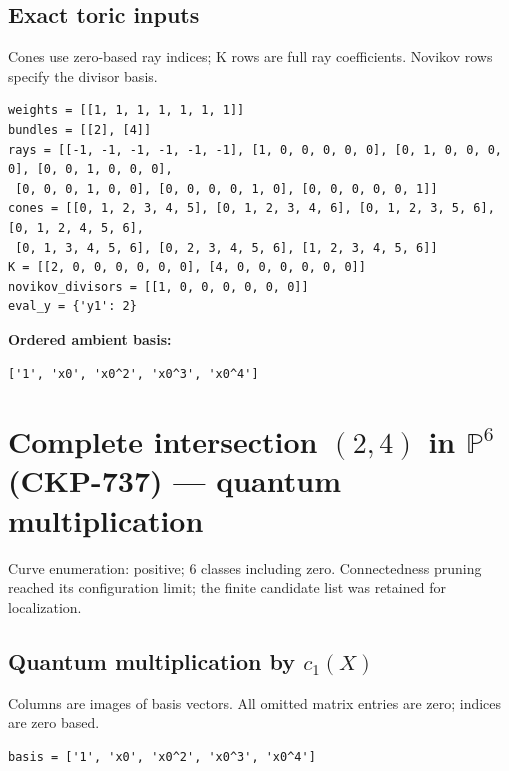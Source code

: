 \documentclass[10pt,a4paper]{article}
\begin{document}
\subsection*{Exact toric inputs}
Cones use zero-based ray indices; K rows are full ray coefficients. Novikov rows specify the divisor basis.

\begin{lstlisting}
weights = [[1, 1, 1, 1, 1, 1, 1]]
bundles = [[2], [4]]
rays = [[-1, -1, -1, -1, -1, -1], [1, 0, 0, 0, 0, 0], [0, 1, 0, 0, 0, 0], [0, 0, 1, 0, 0, 0],
 [0, 0, 0, 1, 0, 0], [0, 0, 0, 0, 1, 0], [0, 0, 0, 0, 0, 1]]
cones = [[0, 1, 2, 3, 4, 5], [0, 1, 2, 3, 4, 6], [0, 1, 2, 3, 5, 6], [0, 1, 2, 4, 5, 6],
 [0, 1, 3, 4, 5, 6], [0, 2, 3, 4, 5, 6], [1, 2, 3, 4, 5, 6]]
K = [[2, 0, 0, 0, 0, 0, 0], [4, 0, 0, 0, 0, 0, 0]]
novikov_divisors = [[1, 0, 0, 0, 0, 0, 0]]
eval_y = {'y1': 2}
\end{lstlisting}

\textbf{Ordered ambient basis:}
\begin{lstlisting}
['1', 'x0', 'x0^2', 'x0^3', 'x0^4']
\end{lstlisting}

\clearpage\section*{Complete intersection $(2,4)$ in $\mathbb P^{6}$ (CKP-737) --- quantum multiplication}

Curve enumeration: positive; 6 classes including zero.
Connectedness pruning reached its configuration limit; the finite candidate list was retained for localization.
\subsection*{Quantum multiplication by $c_1(X)$}
Columns are images of basis vectors. All omitted matrix entries are zero; indices are zero based.

\begin{lstlisting}
basis = ['1', 'x0', 'x0^2', 'x0^3', 'x0^4']
\end{lstlisting}
\end{document}
